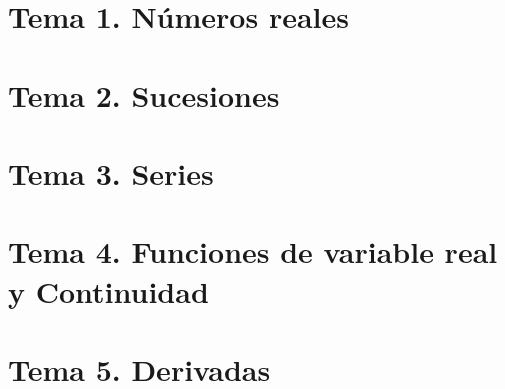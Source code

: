 \documentclass[12pt, twoside, openright]{report} %
\begin{document}






\part{Tema 1. Números reales}







\part{Tema 2. Sucesiones}





\part{Tema 3. Series}





\part{Tema 4. Funciones de variable real y Continuidad}









\part{Tema 5. Derivadas}









\end{document}
